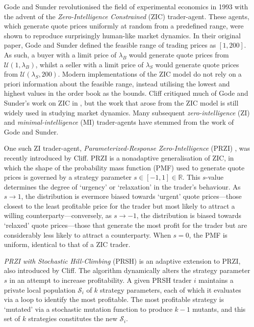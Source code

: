 \documentclass[conference]{IEEEtran}
\begin{document}
Gode and Sunder \cite{GodeSunder} revolutionised the field of experimental economics in 1993 with the advent of the \textit{Zero-Intelligence Constrained} (ZIC) trader-agent.
These agents, which generate quote prices uniformly at random from a predefined range, were shown to reproduce surprisingly human-like market dynamics.
In their original paper, Gode and Sunder defined the feasible range of trading prices as $[1,  200]$.
As such, a buyer with a limit price of $\lambda_B$ would generate quote prices from $\mathcal{U}(1, \lambda_B)$, whilst a seller with a limit price of $\lambda_S$ would generate quote prices from $\mathcal{U}(\lambda_S, 200)$.
Modern implementations of the ZIC model do not rely on a priori information about the feasible range, instead utilising the lowest and highest values in the order book as the bounds.
Cliff critiqued much of Gode and Sunder's work on ZIC in \cite{ZIP}, but the work that arose from the ZIC model is still widely used in studying market dynamics.
Many subsequent \textit{zero-intelligence} (ZI) and \textit{minimal-intelligence} (MI) trader-agents have stemmed from the work of Gode and Sunder.

One such ZI trader-agent, \textit{Parameterized-Response Zero-Intelligence} (PRZI) \cite{PRZI}, was recently introduced by Cliff.
PRZI is a nonadaptive generalisation of ZIC, in which the shape of the probability mass function (PMF) used to generate quote prices is governed by a strategy parameter $s\in[-1, 1]\in\mathbb{R}$.
This $s$-value determines the degree of `urgency' or `relaxation' in the trader's behaviour.
As $s\to1$, the distribution is evermore biased towards `urgent' quote prices---those closest to the least profitable price for the trader but most likely to attract a willing counterparty---conversely, as $s\to-1$, the distribution is biased towards `relaxed' quote prices---those that generate the most profit for the trader but are considerably less likely to attract a counterparty.
When $s=0$, the PMF is uniform, identical to that of a ZIC trader.

\textit{PRZI with Stochastic Hill-Climbing} (PRSH) \cite{PRSH} is an adaptive extension to PRZI, also introduced by Cliff.
The algorithm dynamically alters the strategy parameter $s$ in an attempt to increase profitability.
A given PRSH trader $i$ maintains a private local population $\mathcal{S}_i$ of $k$ strategy parameters, each of which it evaluates via a loop to identify the most profitable.
The most profitable strategy is `mutated' via a stochastic mutation function to produce $k-1$ mutants, and this set of $k$ strategies constitutes the new $\mathcal{S}_i$.
\end{document}
